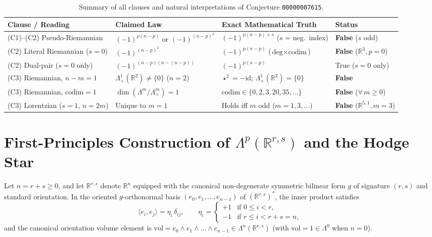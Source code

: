\documentclass[11pt]{article}
\theoremstyle{definition}
\newcommand{\R}{\mathbb{R}}
\newcommand{\vol}{\mathrm{vol}}
\newcommand{\codim}{\mathrm{codim}}
\newcommand{\id}{\mathrm{id}}
\begin{document}
\begin{table}[ht]
\centering
\footnotesize
\setlength{\tabcolsep}{4.5pt}
\begin{tabular}{@{}llll@{}}
\toprule
\textbf{Clause / Reading} & \textbf{Claimed Law} & \textbf{Exact Mathematical Truth} & \textbf{Status} \\
\midrule
(C1)--(C2) Pseudo-Riemannian & $(-1)^{p(n-p)}$ or $(-1)^{(n-p)^2}$ & $(-1)^{p(n-p)+s}$ ($s$ = neg.\ index) & \textbf{False} ($s$ odd) \\
(C2) Literal Riemannian ($s=0$) & $(-1)^{(n-p)^2}$ & $(-1)^{p(n-p)}$ ($\text{deg}\times\text{codim}$) & \textbf{False} ($\R^3, p=0$) \\
(C2) Dual-pair ($s=0$ only) & $(-1)^{(n-p)(n-(n-p))}$ & $(-1)^{p(n-p)}$ & True ($s=0$ only) \\
(C3) Riemannian, $n-m = 1$ & $\Lambda^1_+(\R^2) \neq \{0\}$ ($n=2$) & $\star^2 = -\id$; $\Lambda^1_+(\R^2) = \{0\}$ & \textbf{False} \\
(C3) Riemannian, $\codim = 1$ & $\dim(\Lambda^m/\Lambda^m_+) = 1$ & $\codim \in \{0, 2, 3, 20, 35, \dots\}$ & \textbf{False} ($\forall\, m \ge 0$) \\
(C3) Lorentzian ($s=1$, $n=2m$) & Unique to $m=1$ & Holds iff $m$ odd ($m=1,3,\dots$) & \textbf{False} ($\R^{5,1}, m=3$) \\
\bottomrule
\end{tabular}
\caption{Summary of all clauses and natural interpretations of Conjecture \texttt{00000007615}.}
\label{tab:verdict-summary}
\end{table}

\section{First-Principles Construction of \texorpdfstring{$\Lambda^p(\R^{r,s})$}{Lambda\^{}p(R\^{}(r,s))} and the Hodge Star}

Let $n = r + s \ge 0$, and let $\R^{r,s}$ denote $\R^n$ equipped with the canonical non-degenerate symmetric bilinear form $g$ of signature $(r,s)$ and standard orientation. In the oriented $g$-orthonormal basis $(e_0, e_1, \dots, e_{n-1})$ of $(\R^{r,s})^*$, the inner product satisfies
\begin{equation}\label{eq:metric-diag}
  \langle e_i, e_j \rangle = \eta_i\,\delta_{ij}, \qquad
  \eta_i = \begin{cases}
    +1 & \text{if } 0 \le i < r,\\
    -1 & \text{if } r \le i < r + s = n,
  \end{cases}
\end{equation}
and the canonical orientation volume element is $\vol = e_0 \wedge e_1 \wedge \dots \wedge e_{n-1} \in \Lambda^n(\R^{r,s})$ (with $\vol = 1 \in \Lambda^0$ when $n = 0$).
\end{document}
